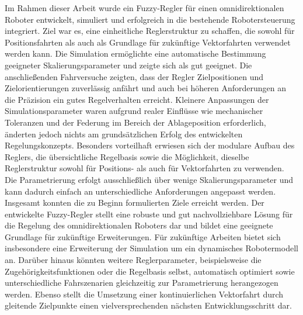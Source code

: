 Im Rahmen dieser Arbeit wurde ein Fuzzy-Regler für einen omnidirektionalen Roboter entwickelt, simuliert und erfolgreich in die bestehende Robotersteuerung integriert. Ziel war es, eine einheitliche Reglerstruktur zu schaffen, die sowohl für Positionsfahrten als auch als Grundlage für zukünftige Vektorfahrten verwendet werden kann. Die Simulation ermöglichte eine automatische Bestimmung geeigneter Skalierungsparameter und zeigte sich als gut geeignet. Die anschließenden Fahrversuche zeigten, dass der Regler Zielpositionen und Zielorientierungen zuverlässig anfährt und auch bei höheren Anforderungen an die Präzision ein gutes Regelverhalten erreicht. Kleinere Anpassungen der Simulationsparameter waren aufgrund realer Einflüsse wie mechanischer Toleranzen und der Federung im Bereich der Ablageposition erforderlich, änderten jedoch nichts am grundsätzlichen Erfolg des entwickelten Regelungskonzepts. Besonders vorteilhaft erwiesen sich der modulare Aufbau des Reglers, die übersichtliche Regelbasis sowie die Möglichkeit, dieselbe Reglerstruktur sowohl für Positions- als auch für Vektorfahrten zu verwenden. Die Parametrierung erfolgt ausschließlich über wenige Skalierungsparameter und kann dadurch einfach an unterschiedliche Anforderungen angepasst werden. Insgesamt konnten die zu Beginn formulierten Ziele erreicht werden. Der entwickelte Fuzzy-Regler stellt eine robuste und gut nachvollziehbare Lösung für die Regelung des omnidirektionalen Roboters dar und bildet eine geeignete Grundlage für zukünftige Erweiterungen. Für zukünftige Arbeiten bietet sich insbesondere eine Erweiterung der Simulation um ein dynamisches Robotermodell an. Darüber hinaus könnten weitere Reglerparameter, beispielsweise die Zugehörigkeitsfunktionen oder die Regelbasis selbst, automatisch optimiert sowie unterschiedliche Fahrszenarien gleichzeitig zur Parametrierung herangezogen werden. Ebenso stellt die Umsetzung einer kontinuierlichen Vektorfahrt durch gleitende Zielpunkte einen vielversprechenden nächsten Entwicklungsschritt dar.